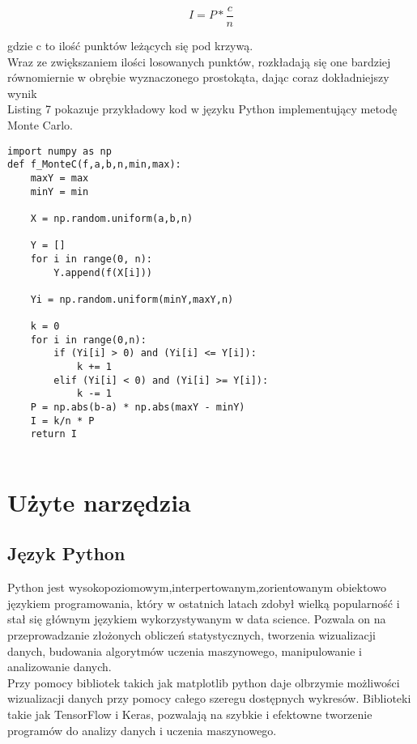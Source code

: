 \documentclass[12pt,twoside]{article}
\begin{document}
\begin{equation}
I = P * \frac{c}{n}
\end{equation}

gdzie c to ilość punktów leżących się pod krzywą.\\

Wraz ze zwiększaniem ilości losowanych punktów, rozkładają się one bardziej równomiernie w obrębie wyznaczonego prostokąta, dając coraz dokładniejszy wynik\cite{MonteCarlo_2.}\\

Listing 7 pokazuje przykładowy kod w języku Python implementujący metodę Monte Carlo.

\begin{lstlisting}[caption={Kod w języku python implementujący metodę Crude Monte Carlo}]
import numpy as np
def f_MonteC(f,a,b,n,min,max):
    maxY = max
    minY = min

    X = np.random.uniform(a,b,n)

    Y = []
    for i in range(0, n):
        Y.append(f(X[i]))

    Yi = np.random.uniform(minY,maxY,n) 
   
    k = 0
    for i in range(0,n):
        if (Yi[i] > 0) and (Yi[i] <= Y[i]):
            k += 1
        elif (Yi[i] < 0) and (Yi[i] >= Y[i]):
            k -= 1
    P = np.abs(b-a) * np.abs(maxY - minY)
    I = k/n * P
    return I
    
\end{lstlisting}
\label{Listing 7}


\section{Użyte narzędzia}

\subsection{Język Python}

Python jest  wysokopoziomowym,interpertowanym,zorientowanym obiektowo językiem programowania, który w ostatnich latach zdobył wielką popularność i stał się głównym językiem wykorzystywanym w data science\cite{Python_1}. Pozwala on na przeprowadzanie złożonych obliczeń statystycznych, tworzenia wizualizacji danych, budowania algorytmów uczenia maszynowego, manipulowanie i analizowanie danych.\\
Przy pomocy bibliotek takich jak matplotlib python daje olbrzymie możliwości wizualizacji danych przy pomocy całego szeregu dostępnych wykresów.
Biblioteki takie jak TensorFlow i Keras, pozwalają na szybkie i efektowne tworzenie programów do analizy danych i uczenia maszynowego\cite{Python_2}.
\end{document}
